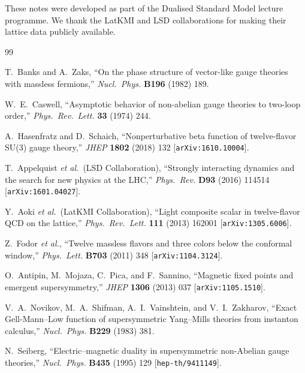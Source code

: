 \documentclass[11pt,a4paper]{article}
\theoremstyle{plain}
\theoremstyle{definition}
\theoremstyle{remark}
\begin{document}
These notes were developed as part of the Dualised Standard Model
lecture programme.  We thank the LatKMI and LSD collaborations for
making their lattice data publicly available.


\begin{thebibliography}{99}

  T.~Banks and A.~Zaks,
  ``On the phase structure of vector-like gauge theories with massless
  fermions,''
  \textit{Nucl.~Phys.} \textbf{B196} (1982) 189.

  W.~E.~Caswell,
  ``Asymptotic behavior of non-abelian gauge theories to two-loop
  order,''
  \textit{Phys.~Rev.~Lett.} \textbf{33} (1974) 244.

  A.~Hasenfratz and D.~Schaich,
  ``Nonperturbative beta function of twelve-flavor SU(3) gauge
  theory,''
  \textit{JHEP} \textbf{1802} (2018) 132
  [\texttt{arXiv:1610.10004}].

  T.~Appelquist \textit{et al.}\ (LSD Collaboration),
  ``Strongly interacting dynamics and the search for new physics at
  the LHC,''
  \textit{Phys.~Rev.} \textbf{D93} (2016) 114514
  [\texttt{arXiv:1601.04027}].

  Y.~Aoki \textit{et al.}\ (LatKMI Collaboration),
  ``Light composite scalar in twelve-flavor QCD on the lattice,''
  \textit{Phys.~Rev.~Lett.} \textbf{111} (2013) 162001
  [\texttt{arXiv:1305.6006}].

  Z.~Fodor \textit{et al.},
  ``Twelve massless flavors and three colors below the conformal
  window,''
  \textit{Phys.~Lett.} \textbf{B703} (2011) 348
  [\texttt{arXiv:1104.3124}].

  O.~Antipin, M.~Mojaza, C.~Pica, and F.~Sannino,
  ``Magnetic fixed points and emergent supersymmetry,''
  \textit{JHEP} \textbf{1306} (2013) 037
  [\texttt{arXiv:1105.1510}].

  V.~A.~Novikov, M.~A.~Shifman, A.~I.~Vainshtein, and
  V.~I.~Zakharov,
  ``Exact Gell-Mann--Low function of supersymmetric Yang--Mills
  theories from instanton calculus,''
  \textit{Nucl.~Phys.} \textbf{B229} (1983) 381.

  N.~Seiberg,
  ``Electric--magnetic duality in supersymmetric non-Abelian gauge
  theories,''
  \textit{Nucl.~Phys.} \textbf{B435} (1995) 129
  [\texttt{hep-th/9411149}].


\end{thebibliography}
\end{document}
